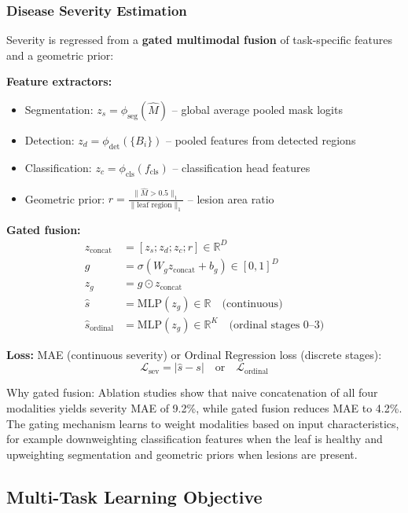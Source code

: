 \documentclass[10pt,a4paper,twocolumn]{article}
\begin{document}
\subsubsection{Disease Severity Estimation}

Severity is regressed from a \textbf{gated multimodal fusion} of task-specific features and a geometric prior:

\textbf{Feature extractors:}
\begin{itemize}
    \item Segmentation: $z_s = \phi_{\text{seg}}(\hat{M})$ -- global average pooled mask logits
    \item Detection: $z_d = \phi_{\text{det}}(\{B_i\})$ -- pooled features from detected regions
    \item Classification: $z_c = \phi_{\text{cls}}(f_{\text{cls}})$ -- classification head features
    \item Geometric prior: $r = \frac{\|\hat{M} > 0.5\|_1}{\|\text{leaf region}\|_1}$ -- lesion area ratio
\end{itemize}

\textbf{Gated fusion:}
\begin{align}
z_{\text{concat}} &= [z_s; z_d; z_c; r] \in \mathbb{R}^D \\
g &= \sigma(W_g z_{\text{concat}} + b_g) \in [0,1]^D \\
z_g &= g \odot z_{\text{concat}} \\
\hat{s} &= \text{MLP}(z_g) \in \mathbb{R} \quad \text{(continuous)} \\
\hat{s}_{\text{ordinal}} &= \text{MLP}(z_g) \in \mathbb{R}^K \quad \text{(ordinal stages 0--3)}
\end{align}

\textbf{Loss:} MAE (continuous severity) or Ordinal Regression loss (discrete stages):
\begin{equation}
\mathcal{L}_{\text{sev}} = |\hat{s} - s| \quad \text{or} \quad \mathcal{L}_{\text{ordinal}}
\end{equation}

Why gated fusion: Ablation studies show that naive concatenation of all four modalities yields severity MAE of 9.2\%, while gated fusion reduces MAE to 4.2\%. The gating mechanism learns to weight modalities based on input characteristics, for example downweighting classification features when the leaf is healthy and upweighting segmentation and geometric priors when lesions are present.

\subsection{Multi-Task Learning Objective}
\end{document}
